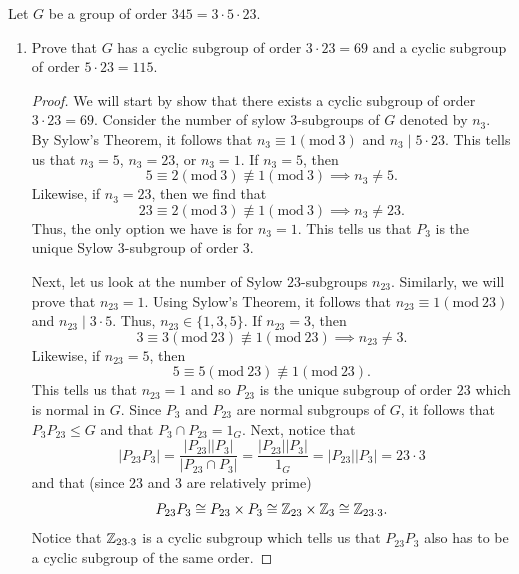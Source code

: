\documentclass[a4paper]{article}
\begin{document}
\begin{problem}
    Let \( G  \) be a group of order \( 345 = 3 \cdot 5 \cdot 23 \).
    \begin{enumerate}
        \item[(a)] Prove that \( G  \) has a cyclic subgroup of order \( 3 \cdot 23 = 69 \) and a cyclic subgroup of order \( 5 \cdot 23 = 115 \).
            \begin{proof}
                We will start by show that there exists a cyclic subgroup of order \( 3 \cdot 23 = 69 \). Consider the number of sylow \( 3 \)-subgroups of \( G  \) denoted by \( {n}_{3}  \). By Sylow's Theorem, it follows that \( {n}_{3} \equiv 1 (\text{mod} \ 3) \) and \( {n}_{3} \mid 5 \cdot 23 \). This tells us that \( {n}_{3} = 5  \), \( {n}_{3} = 23  \), or \( {n}_{3} = 1  \). If \( {n}_{3} = 5  \), then 
                \[  5 \equiv 2 (\text{mod} \ 3) \not\equiv 1 (\text{mod} \ 3) \implies {n}_{3} \neq 5. \]
                Likewise, if \( {n}_{3} = 23 \), then we find that 
                \[  23 \equiv 2 (\text{mod} \ 3) \not\equiv 1 (\text{mod} \ 3) \implies {n}_{3} \neq 23. \]
                Thus, the only option we have is for \( {n}_{3} = 1  \). This tells us that \( {P}_{3} \) is the unique Sylow \( 3 \)-subgroup of order \( 3  \). 

                Next, let us look at the number of Sylow \( 23 \)-subgroups \( {n}_{23}  \). Similarly, we will prove that \( {n}_{23} = 1  \). Using Sylow's Theorem, it follows that \( {n}_{23} \equiv 1 (\text{mod} \ 23) \) and \( {n}_{23} \mid 3 \cdot 5 \). Thus, \( {n}_{23} \in \{ 1,3,5 \} \). If \( {n}_{23} = 3  \), then  
                \[  3 \equiv 3 (\text{mod} \ 23) \not\equiv 1 (\text{mod} \ 23) \implies {n}_{23} \neq 3.  \]
                Likewise, if \( {n}_{23}  = 5  \), then
                \[  5 \equiv 5 (\text{mod} \ 23) \not\equiv 1 (\text{mod} \ 23). \]
                This tells us that \( {n}_{23} = 1 \) and so \( {P}_{23} \) is the unique subgroup of order \( 23 \) which is normal in \( G  \). 
                Since \( {P}_{3} \) and \( {P}_{23} \) are normal subgroups of \( G  \), it follows that \( {P}_{3} {P}_{23} \leq G  \) and that \( {P}_{3} \cap {P}_{23} = {1}_{G} \). Next, notice that 
                \[ | {P}_{23} {P}_{3} |  = \frac{ | {P}_{23} | | {P}_{3} |  }{ | {P}_{23} \cap {P}_{3} |   }  = \frac{ | {P}_{23} | | {P}_{3} |  }{ {1}_{G} }  = | {P}_{23} |  | {P}_{3} |  = 23 \cdot 3  \]
                and that (since \( 23 \) and \( 3  \) are relatively prime) 
                \[  {P}_{23}{P}_{3} \cong {P}_{23} \times {P}_{3} \cong {\ensuremath{\mathbb{Z}}}_{23} \times {\ensuremath{\mathbb{Z}}}_{3} \cong {\ensuremath{\mathbb{Z}}}_{23 \cdot 3}.   \]
                Notice that \( {\mathbb{Z}}_{23 \cdot 3} \) is a cyclic subgroup which tells us that \( {P}_{23} {P}_{3} \) also has to be a cyclic subgroup of the same order.


\end{proof}
\end{enumerate}
\end{problem}
\end{document}
